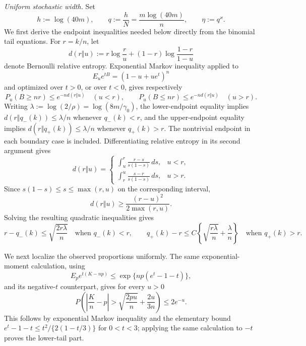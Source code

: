 \emph{Uniform stochastic width.}  Set
\[
 h:=\log(40m),\qquad q:=\frac hN=\frac{m\log(40m)}n,
 \qquad \eta:=q^{\varkappa}.
\]
We first derive the endpoint inequalities needed below directly from the binomial tail equations.  For \(r=k/n\), let
\[
 d(r\Vert u):=r\log\frac ru+(1-r)\log\frac{1-r}{1-u}
\]
denote Bernoulli relative entropy.  Exponential Markov inequality applied to
\[
 E_u e^{tB}=(1-u+ue^t)^n
\]
and optimized over \(t>0\), or over \(t<0\), gives respectively
\[
 P_u(B\geq nr)\leq e^{-nd(r\Vert u)}\quad(u<r),
 \qquad
 P_u(B\leq nr)\leq e^{-nd(r\Vert u)}\quad(u>r).
\]
Writing \(\lambda:=\log(2/\rho)=\log(8m/\gamma_0)\), the lower-endpoint equality implies \(d(r\Vert q_-(k))\leq\lambda/n\) whenever \(q_-(k)<r\), and the upper-endpoint equality implies \(d(r\Vert q_+(k))\leq\lambda/n\) whenever \(q_+(k)>r\).  The nontrivial endpoint in each boundary case is included.  Differentiating relative entropy in its second argument gives
\[
 d(r\Vert u)=
 \begin{cases}
 \displaystyle\int_u^r\frac{r-s}{s(1-s)}\,ds,&u<r,\\[6pt]
 \displaystyle\int_r^u\frac{s-r}{s(1-s)}\,ds,&u>r.
 \end{cases}
\]
Since \(s(1-s)\leq s\leq\max(r,u)\) on the corresponding interval,
\[
 d(r\Vert u)\geq\frac{(r-u)^2}{2\max(r,u)}.
\]
Solving the resulting quadratic inequalities gives
\[
 r-q_-(k)\leq\sqrt{\frac{2r\lambda}{n}}
 \quad\text{when }q_-(k)<r,
 \qquad
 q_+(k)-r\leq C\left\{\sqrt{\frac{r\lambda}{n}}+\frac\lambda n\right\}
 \quad\text{when }q_+(k)>r.
 \tag{1}
\]

We next localize the observed proportions uniformly.  The same exponential-moment calculation, using
\[
 E_p e^{t(K-np)}
 \leq\exp\{np(e^t-1-t)\},
\]
and its negative-\(t\) counterpart, gives for every \(u>0\)
\[
 P\!\left(\left|\frac Kn-p\right|>
       \sqrt{\frac{2pu}{n}}+\frac{2u}{3n}\right)
 \leq2e^{-u}.
 \tag{2}
\]
This follows by exponential Markov inequality and the elementary bound
\(e^t-1-t\leq t^2/\{2(1-t/3)\}\) for \(0<t<3\); applying the same calculation to \(-t\) proves the lower-tail part.

